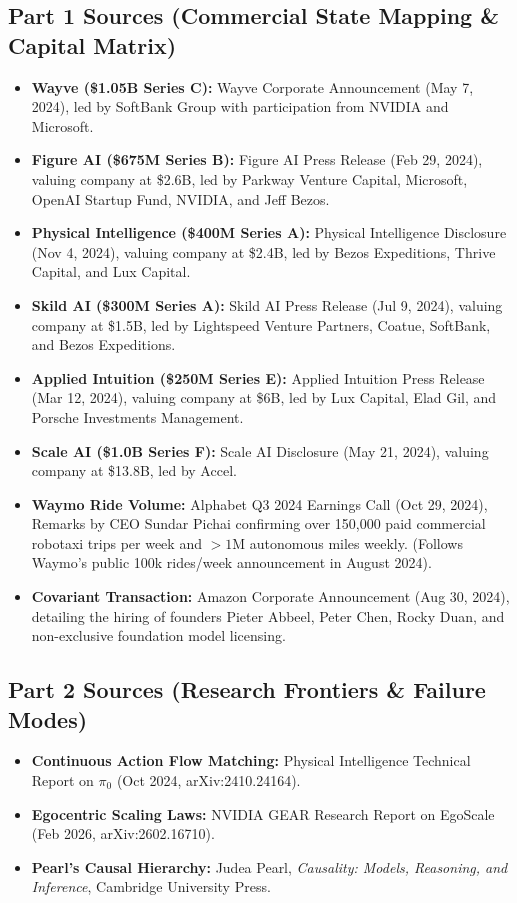 \documentclass[11pt,a4paper]{article}
\begin{document}
\subsection*{Part 1 Sources (Commercial State Mapping \& Capital Matrix)}
\begin{itemize}
    \item \textbf{Wayve (\$1.05B Series C):} Wayve Corporate Announcement (May 7, 2024), led by SoftBank Group with participation from NVIDIA and Microsoft.
    \item \textbf{Figure AI (\$675M Series B):} Figure AI Press Release (Feb 29, 2024), valuing company at \$2.6B, led by Parkway Venture Capital, Microsoft, OpenAI Startup Fund, NVIDIA, and Jeff Bezos.
    \item \textbf{Physical Intelligence (\$400M Series A):} Physical Intelligence Disclosure (Nov 4, 2024), valuing company at \$2.4B, led by Bezos Expeditions, Thrive Capital, and Lux Capital.
    \item \textbf{Skild AI (\$300M Series A):} Skild AI Press Release (Jul 9, 2024), valuing company at \$1.5B, led by Lightspeed Venture Partners, Coatue, SoftBank, and Bezos Expeditions.
    \item \textbf{Applied Intuition (\$250M Series E):} Applied Intuition Press Release (Mar 12, 2024), valuing company at \$6B, led by Lux Capital, Elad Gil, and Porsche Investments Management.
    \item \textbf{Scale AI (\$1.0B Series F):} Scale AI Disclosure (May 21, 2024), valuing company at \$13.8B, led by Accel.
    \item \textbf{Waymo Ride Volume:} Alphabet Q3 2024 Earnings Call (Oct 29, 2024), Remarks by CEO Sundar Pichai confirming over 150,000 paid commercial robotaxi trips per week and $>1\text{M}$ autonomous miles weekly. (Follows Waymo's public 100k rides/week announcement in August 2024).
    \item \textbf{Covariant Transaction:} Amazon Corporate Announcement (Aug 30, 2024), detailing the hiring of founders Pieter Abbeel, Peter Chen, Rocky Duan, and non-exclusive foundation model licensing.
\end{itemize}

\subsection*{Part 2 Sources (Research Frontiers \& Failure Modes)}
\begin{itemize}
    \item \textbf{Continuous Action Flow Matching:} Physical Intelligence Technical Report on $\pi_0$ (Oct 2024, arXiv:2410.24164).
    \item \textbf{Egocentric Scaling Laws:} NVIDIA GEAR Research Report on EgoScale (Feb 2026, arXiv:2602.16710).
    \item \textbf{Pearl's Causal Hierarchy:} Judea Pearl, \textit{Causality: Models, Reasoning, and Inference}, Cambridge University Press.
\end{itemize}
\end{document}
